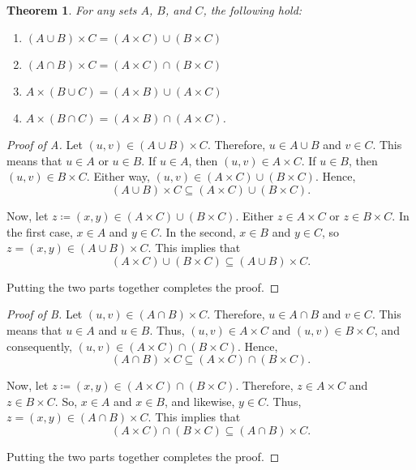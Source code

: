 \documentclass[headings=standardclasses]{scrartcl}
\newtheorem{theorem}{Theorem}[subsection]
\theoremstyle{definition}
\begin{document}
\begin{theorem}
  For any sets \(A\), \(B\), and \(C\), the following hold:
  \begin{enumerate}[label=(\alph*)]
    \item \((A ∪ B) × C = (A × C) ∪ (B × C)\)
    \item \((A ∩ B) × C = (A × C) ∩ (B × C)\)
    \item \(A × (B ∪ C) = (A × B) ∪ (A × C)\)
    \item \(A × (B ∩ C) = (A × B) ∩ (A × C)\).
  \end{enumerate}
\end{theorem}

\begin{proof}[Proof of A]
  Let \((u, v) ∈ (A ∪ B) × C\). Therefore, \(u ∈ A ∪ B\) and \(v ∈ C\). This
  means that \(u ∈ A\) or \(u ∈ B\). If \(u ∈ A\), then \((u, v) ∈ A × C\). If
  \(u ∈ B\), then \((u, v) ∈ B × C\). Either way, \((u, v) ∈ (A × C) ∪ (B ×
  C)\). Hence,
  \begin{equation*}
    (A ∪ B) × C ⊆ (A × C) ∪ (B × C).
  \end{equation*}

  Now, let \(z ≔ (x, y) ∈ (A × C) ∪ (B × C)\). Either \(z ∈ A × C\) or \(z ∈ B
  × C\). In the first case, \(x ∈ A\) and \(y ∈ C\). In the second, \(x ∈ B\)
  and \(y ∈ C\), so \(z = (x, y) ∈ (A ∪ B) × C\). This implies that
  \begin{equation*}
    (A × C) ∪ (B × C) ⊆ (A ∪ B) × C.
  \end{equation*}

  Putting the two parts together completes the proof.
\end{proof}

\begin{proof}[Proof of B]
  Let \((u, v) ∈ (A ∩ B) × C\). Therefore, \(u ∈ A ∩ B\) and \(v ∈ C\). This
  means that \(u ∈ A\) and \(u ∈ B\). Thus, \((u, v) ∈ A × C\) and \((u, v) ∈ B
  × C\), and consequently, \((u, v) ∈ (A × C) ∩ (B × C)\). Hence,
  \begin{equation*}
    (A ∩ B) × C ⊆ (A × C) ∩ (B × C).
  \end{equation*}

  Now, let \(z ≔ (x, y) ∈ (A × C) ∩ (B × C)\).  Therefore, \(z ∈ A × C\) and
  \(z ∈ B × C\). So, \(x ∈ A\) and \(x ∈ B\), and likewise, \(y ∈ C\). Thus,
  \(z = (x, y) ∈ (A ∩ B) × C\). This implies that
  \begin{equation*}
       (A × C) ∩ (B × C) ⊆ (A ∩ B) × C.
  \end{equation*}

  Putting the two parts together completes the proof.
\end{proof}
\end{document}
